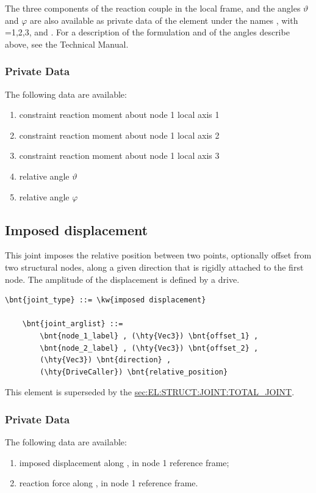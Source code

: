 The three components of the reaction couple in the local frame, 
and the angles $\vartheta$ and $\varphi$ are also available
as private data of the element under the names ,
with =1,2,3,  and .
For a description of the formulation and of the angles describe above,
see the Technical Manual.

\subsubsection{Private Data}
The following data are available:
\begin{enumerate}
\item {} constraint reaction moment about node 1 local axis 1
\item {} constraint reaction moment about node 1 local axis 2
\item {} constraint reaction moment about node 1 local axis 3
\item {} relative angle $\vartheta$
\item {} relative angle $\varphi$
\end{enumerate}



\subsection{Imposed displacement}
\label{sec:EL:JOINT:IMPOSEDDISPLACEMENT}
This joint imposes the relative position between two points,
optionally offset from two structural nodes,
along a given direction that is rigidly attached to the first node.
The amplitude of the displacement is defined by a drive.
\begin{Verbatim}[commandchars=\\\{\}]
    \bnt{joint_type} ::= \kw{imposed displacement}

    \bnt{joint_arglist} ::= 
        \bnt{node_1_label} , (\hty{Vec3}) \bnt{offset_1} ,
        \bnt{node_2_label} , (\hty{Vec3}) \bnt{offset_2} ,
        (\hty{Vec3}) \bnt{direction} ,
        (\hty{DriveCaller}) \bnt{relative_position}
\end{Verbatim}
This element is superseded by the
\hyperref{\kw{total joint}}{\kw{total joint}, see Section~}{}{sec:EL:STRUCT:JOINT:TOTAL_JOINT}.

\subsubsection{Private Data}
The following data are available:
\begin{enumerate}
\item {} imposed displacement along ,
in node 1 reference frame;
\item {} reaction force along ,
in node 1 reference frame.
\end{enumerate}

